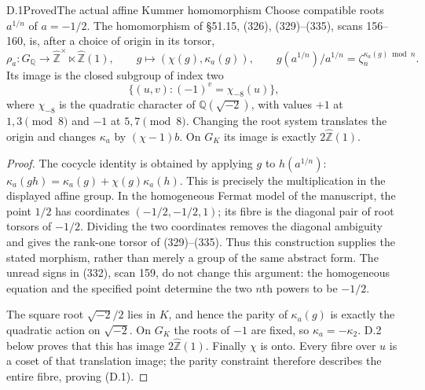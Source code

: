 \begin{statement}{D.1}{Proved}{The actual affine Kummer homomorphism}
Choose compatible roots $a^{1/n}$ of $a=-1/2$. The homomorphism of \S51.15, (326), (329)--(335), scans 156--160, is, after a choice of origin in its torsor,
\[
 \rho_a:G_{\mathbb Q}\longrightarrow
 \widehat{\mathbb Z}^{\times}\ltimes\widehat{\mathbb Z}(1),
 \qquad g\longmapsto(\chi(g),\kappa_a(g)),\qquad
 g(a^{1/n})/a^{1/n}=\zeta_n^{\kappa_a(g)\bmod n}.
\]
Its image is the closed subgroup of index two
\[
 \{(u,v):(-1)^v=\chi_{-8}(u)\},                         \tag{D.1}
\]
where $\chi_{-8}$ is the quadratic character of $\mathbb Q(\sqrt{-2})$, with values $+1$ at $1,3\pmod8$ and $-1$ at $5,7\pmod8$. Changing the root system translates the origin and changes $\kappa_a$ by $(\chi-1)b$. On $G_K$ its image is exactly $2\widehat{\mathbb Z}(1)$.
\end{statement}
\begin{proof}
The cocycle identity is obtained by applying $g$ to $h(a^{1/n})$:
$\kappa_a(gh)=\kappa_a(g)+\chi(g)\kappa_a(h)$. This is precisely the multiplication in the displayed affine group. In the homogeneous Fermat model of the manuscript, the point $1/2$ has coordinates $(-1/2,-1/2,1)$; its fibre is the diagonal pair of root torsors of $-1/2$. Dividing the two coordinates removes the diagonal ambiguity and gives the rank-one torsor of (329)--(335). Thus this construction supplies the stated morphism, rather than merely a group of the same abstract form. The unread signs in (332), scan 159, do not change this argument: the homogeneous equation and the specified point determine the two $n$th powers to be $-1/2$.

The square root $\sqrt{-2}/2$ lies in $K$, and hence the parity of $\kappa_a(g)$ is exactly the quadratic action on $\sqrt{-2}$. On $G_K$ the roots of $-1$ are fixed, so $\kappa_a=-\kappa_2$. D.2 below proves that this has image $2\widehat{\mathbb Z}(1)$. Finally $\chi$ is onto. Every fibre over $u$ is a coset of that translation image; the parity constraint therefore describes the entire fibre, proving (D.1).
\end{proof}

